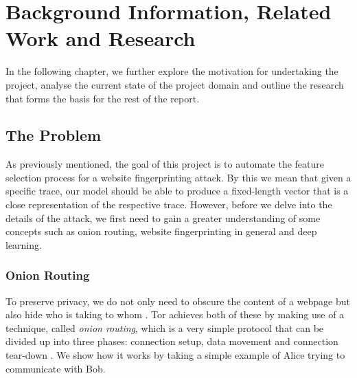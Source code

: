 

\section{Background Information, Related Work and Research}
In the following chapter, we further explore the motivation for undertaking the project,
analyse the current state of the project domain and outline the research that forms the basis for the rest of the report.

\subsection{The Problem}
As previously mentioned, the goal of this project is to automate the feature selection process for a website fingerprinting attack.
By this we mean that given a specific trace, our model should be able to produce a fixed-length vector that is a close representation of the respective trace.
However, before we delve into the details of the attack, we first need to gain a greater understanding of some concepts such as
onion routing, website fingerprinting in general and deep learning.

\subsubsection{Onion Routing}
To preserve privacy, we do not only need to obscure the content of a webpage but also hide who is taking to whom \cite{goldschlag1999onion}.
Tor achieves both of these by making use of a technique, called \textit{onion routing}, which is a very simple protocol that can be divided up into three phases:
connection setup, data movement and connection tear-down \cite{goldschlag1999onion}. We show how it works by taking a simple example of Alice trying to communicate with Bob.

